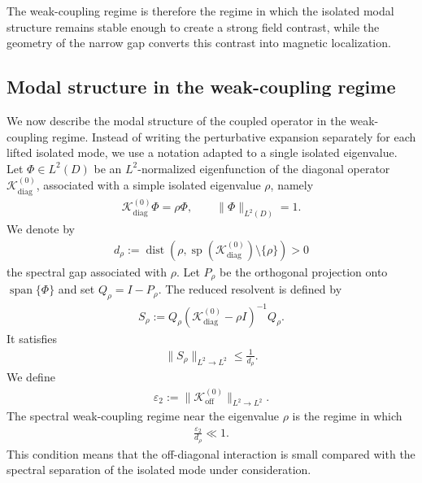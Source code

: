 \documentclass[10pt]{article}
\numberwithin{equation}{section}
\begin{document}
The weak-coupling regime is therefore the regime in which the isolated modal structure remains stable enough to create a strong field contrast, while the geometry of the narrow gap converts this contrast into magnetic localization.























\subsection{Modal structure in the weak-coupling regime}
\label{subsec:modal_structure_weak_coupling}

We now describe the modal structure of the coupled operator in the weak-coupling regime. Instead of writing the perturbative expansion separately for each lifted isolated mode, we use a notation adapted to a single isolated eigenvalue.\\
Let $\Phi\in L^2(D)$ be an $L^2$-normalized eigenfunction of the diagonal operator $\mathcal K_{\mathrm{diag}}^{(0)}$, associated with a simple isolated eigenvalue $\rho$, namely
\begin{align}
    \mathcal K_{\mathrm{diag}}^{(0)}\Phi=\rho\Phi,
    \qquad
    \|\Phi\|_{L^2(D)}=1.
\end{align}
We denote by
\begin{align}
    d_\rho
    :=
    \operatorname{dist}
    \left(
    \rho,
    \operatorname{sp}(\mathcal K_{\mathrm{diag}}^{(0)})\setminus\{\rho\}
    \right)
    >0
    \label{eq:spectral_gap_drho}
\end{align}
the spectral gap associated with $\rho$. Let $P_\rho$ be the orthogonal projection onto $\operatorname{span}\{\Phi\}$ and set $Q_\rho=I-P_\rho$. The reduced resolvent is defined by
\begin{align}
    S_\rho
    :=
    Q_\rho(\mathcal K_{\mathrm{diag}}^{(0)}-\rho I)^{-1}Q_\rho.
\end{align}
It satisfies
\begin{align}
    \|S_\rho\|_{L^2\to L^2}\leq \frac{1}{d_\rho}.
\end{align}
We define
\begin{align}
    \varepsilon_2
    :=
    \|\mathcal K_{\mathrm{off}}^{(0)}\|_{L^2\to L^2}.
\end{align}
The spectral weak-coupling regime near the eigenvalue $\rho$ is the regime in which
\begin{align}
    \frac{\varepsilon_2}{d_\rho}\ll1.
    \label{eq:spectral_wc_eps}
\end{align}
This condition means that the off-diagonal interaction is small compared with the spectral separation of the isolated mode under consideration.
\end{document}
